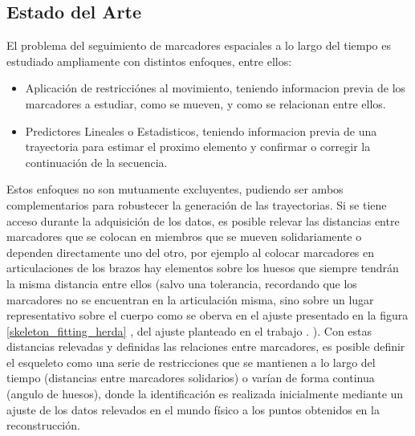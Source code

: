 \subsection{Estado del Arte}

El problema del seguimiento de marcadores espaciales a lo largo del tiempo es estudiado ampliamente con distintos enfoques, entre ellos:

\begin{itemize}

\item Aplicación de restricciónes al movimiento, teniendo informacion previa de los marcadores a estudiar, como se mueven, y como se relacionan entre ellos. 

\item Predictores Lineales o Estadisticos, teniendo informacion previa de una trayectoria para estimar el proximo elemento y confirmar o corregir la continuación de la secuencia.

\end{itemize}

Estos enfoques no son mutuamente excluyentes, pudiendo ser ambos complementarios para robustecer la generación de las trayectorias. Si se tiene acceso durante la adquisición de los datos, es posible relevar las distancias entre marcadores que se colocan en miembros que se mueven solidariamente  o dependen directamente uno del otro, por ejemplo al colocar marcadores en articulaciones de los brazos hay elementos sobre los huesos que siempre tendrán la misma distancia entre ellos (salvo una tolerancia, recordando que los marcadores no se encuentran en la articulación misma, sino sobre un lugar representativo sobre el cuerpo como se oberva en el ajuste presentado en la figura \ref{skeleton_fitting_herda} , del ajuste planteado en el trabajo \cite{herda}. ). Con estas distancias relevadas y definidas las relaciones entre marcadores, es posible definir el esqueleto como una serie de restricciones que se mantienen a lo largo del tiempo (distancias entre marcadores solidarios) o varían de forma continua (angulo de huesos), donde la identificación es realizada inicialmente mediante un ajuste de los datos relevados en el mundo físico a los puntos obtenidos en la reconstrucción. 

